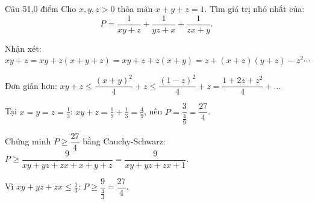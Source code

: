 \begin{de_cau}{Câu 5}{1,0 điểm}
Cho $x, y, z > 0$ thỏa mãn $x + y + z = 1$. Tìm giá trị nhỏ nhất của:
\[P = \dfrac{1}{xy+z} + \dfrac{1}{yz+x} + \dfrac{1}{zx+y}.\]
\end{de_cau}

\begin{loi_giai_cau}
Nhận xét: $xy+z=xy+z(x+y+z)=xy+z+z(x+y)=z+(x+z)(y+z)-z^2\cdots$

Đơn giản hơn: $xy+z\le\dfrac{(x+y)^2}{4}+z\le\dfrac{(1-z)^2}{4}+z=\dfrac{1+2z+z^2}{4}+\ldots$

Tại $x=y=z=\frac{1}{3}$: $xy+z=\frac{1}{9}+\frac{1}{3}=\frac{4}{9}$, nên $P=\dfrac{3}{\frac{4}{9}}=\dfrac{27}{4}$.

Chứng minh $P\ge\dfrac{27}{4}$ bằng Cauchy-Schwarz: $P\ge\dfrac{9}{xy+yz+zx+x+y+z}=\dfrac{9}{xy+yz+zx+1}$.

Vì $xy+yz+zx\le\frac{1}{3}$: $P\ge\dfrac{9}{\frac{4}{3}}=\boxed{\dfrac{27}{4}}$.
\end{loi_giai_cau}
